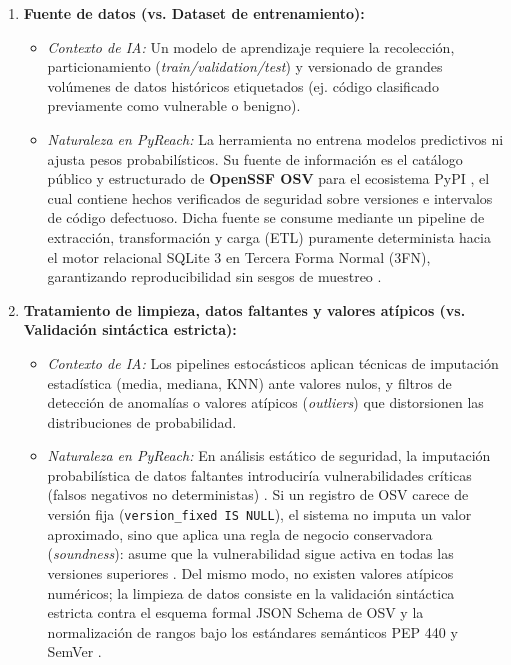 \begin{enumerate}
    \item \textbf{Fuente de datos (vs. Dataset de entrenamiento):}
    \begin{itemize}
        \item \textit{Contexto de IA:} Un modelo de aprendizaje requiere la recolección, particionamiento (\textit{train/validation/test}) y versionado de grandes volúmenes de datos históricos etiquetados (ej. código clasificado previamente como vulnerable o benigno).
        \item \textit{Naturaleza en PyReach:} La herramienta no entrena modelos predictivos ni ajusta pesos probabilísticos. Su fuente de información es el catálogo público y estructurado de \textbf{OpenSSF OSV} para el ecosistema PyPI \cite{openssf2023osv}, el cual contiene hechos verificados de seguridad sobre versiones e intervalos de código defectuoso. Dicha fuente se consume mediante un pipeline de extracción, transformación y carga (ETL) puramente determinista hacia el motor relacional SQLite 3 en Tercera Forma Normal (3FN), garantizando reproducibilidad sin sesgos de muestreo \cite{openssf2023osv, torres2026proyecto}.
    \end{itemize}

    \item \textbf{Tratamiento de limpieza, datos faltantes y valores atípicos (vs. Validación sintáctica estricta):}
    \begin{itemize}
        \item \textit{Contexto de IA:} Los pipelines estocásticos aplican técnicas de imputación estadística (media, mediana, KNN) ante valores nulos, y filtros de detección de anomalías o valores atípicos (\textit{outliers}) que distorsionen las distribuciones de probabilidad.
        \item \textit{Naturaleza en PyReach:} En análisis estático de seguridad, la imputación probabilística de datos faltantes introduciría vulnerabilidades críticas (falsos negativos no deterministas) \cite{pashchenko2022vuln4real}. Si un registro de OSV carece de versión fija (\texttt{version\_\allowbreak fixed IS NULL}), el sistema no imputa un valor aproximado, sino que aplica una regla de negocio conservadora (\textit{soundness}): asume que la vulnerabilidad sigue activa en todas las versiones superiores \cite{nielson1999principles}. Del mismo modo, no existen valores atípicos numéricos; la limpieza de datos consiste en la validación sintáctica estricta contra el esquema formal JSON Schema de OSV y la normalización de rangos bajo los estándares semánticos PEP 440 y SemVer \cite{openssf2023osv}.
    \end{itemize}


\end{enumerate}
